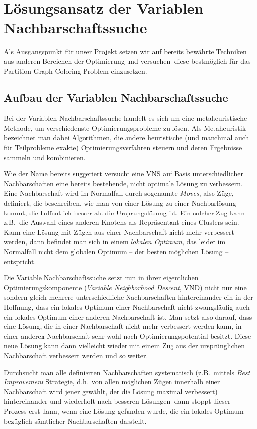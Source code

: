 \chapter{Lösungsansatz der Variablen Nachbarschaftssuche}
\label{sec:ansatz}
Als Ausgangspunkt für unser Projekt setzen wir auf bereits bewährte Techniken aus anderen Bereichen der Optimierung und versuchen, diese bestmöglich für das Partition Graph Coloring Problem einzusetzen.

\section{Aufbau der Variablen Nachbarschaftssuche}
\label{sec:vns}
Bei der Variablen Nachbarschaftssuche handelt es sich um eine metaheuristische Methode, um verschiedenste Optimierungsprobleme zu lösen. Als Metaheuristik bezeichnet man dabei Algorithmen, die andere heuristische (und manchmal auch für Teilprobleme exakte) Optimierungsverfahren steuern und deren Ergebnisse sammeln und kombinieren.

Wie der Name bereits suggeriert versucht eine VNS auf Basis unterschiedlicher Nachbarschaften eine bereits bestehende, nicht optimale Lösung zu verbessern. Eine Nachbarschaft wird im Normalfall durch sogenannte \emph{Moves}, also Züge, definiert, die beschreiben, wie man von einer Lösung zu einer Nachbarlösung kommt, die hoffentlich besser als die Ursprungslösung ist. Ein solcher Zug kann z.B.\ die Auswahl eines anderen Knotens als Repräsentant eines Clusters sein. Kann eine Lösung mit Zügen aus einer Nachbarschaft nicht mehr verbessert werden, dann befindet man sich in einem \emph{lokalen Optimum}, das leider im Normalfall nicht dem globalen Optimum -- der besten möglichen Lösung -- entspricht.

Die Variable Nachbarschaftssuche setzt nun in ihrer eigentlichen Optimierungskomponente (\emph{Variable Neighborhood Descent}, VND) nicht nur eine sondern gleich mehrere unterschiedliche Nachbarschaften hintereinander ein in der Hoffnung, dass ein lokales Optimum einer Nachbarschaft nicht zwangsläufig auch ein lokales Optimum einer anderen Nachbarschaft ist. Man setzt also darauf, dass eine Lösung, die in einer Nachbarschaft nicht mehr verbessert werden kann, in einer anderen Nachbarschaft sehr wohl noch Optimierungspotential besitzt. Diese neue Lösung kann dann vielleicht wieder mit einem Zug aus der ursprünglichen Nachbarschaft verbessert werden und so weiter.

Durchsucht man alle definierten Nachbarschaften systematisch (z.B.\ mittels \emph{Best Improvement} Strategie, d.h.\ von allen möglichen Zügen innerhalb einer Nachbarschaft wird jener gewählt, der die Lösung maximal verbessert) hintereinander und wiederholt nach besseren Lösungen, dann stoppt dieser Prozess erst dann, wenn eine Lösung gefunden wurde, die ein lokales Optimum bezüglich sämtlicher Nachbarschaften darstellt.

